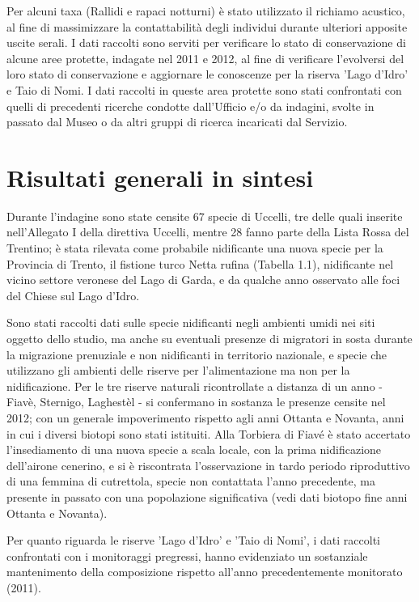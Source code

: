\documentclass[11pt,a4paper,twoside]{memoir}
\begin{document}
Per alcuni taxa (Rallidi e rapaci notturni) è stato utilizzato il richiamo acustico, al fine di massimizzare la contattabilità degli individui durante ulteriori apposite uscite serali. I dati raccolti sono serviti per verificare lo stato di conservazione di alcune aree protette, indagate nel 2011 e 2012, al fine di verificare l'evolversi del loro stato di conservazione e aggiornare le conoscenze per la riserva 'Lago d'Idro' e Taio di Nomi. I dati raccolti in queste area protette sono stati confrontati con quelli di precedenti ricerche condotte dall'Ufficio e/o da indagini, svolte in passato dal Museo o da altri gruppi di ricerca incaricati dal Servizio.

\chapter{Risultati generali in sintesi}
Durante l'indagine sono state censite 67 specie di Uccelli, tre delle quali inserite nell'Allegato I della direttiva Uccelli, mentre 28 fanno parte della Lista Rossa del Trentino; è stata rilevata come probabile nidificante una nuova specie per la Provincia di Trento, il fistione turco Netta rufina (Tabella 1.1), nidificante nel vicino settore veronese del Lago di Garda, e da qualche anno osservato alle foci del Chiese sul Lago d’Idro.

Sono stati raccolti dati sulle specie nidificanti negli ambienti umidi nei siti oggetto dello studio, ma anche su eventuali presenze di migratori in sosta durante la migrazione prenuziale  e non nidificanti in territorio nazionale, e specie che utilizzano gli ambienti delle riserve per l'alimentazione ma non per la nidificazione.
Per le tre riserve naturali ricontrollate a distanza di un anno - Fiavè, Sternigo, Laghestèl - si confermano in sostanza le presenze censite nel 2012; con un generale impoverimento rispetto agli anni Ottanta e Novanta, anni in cui i diversi biotopi sono stati istituiti. Alla Torbiera di Fiavé è stato accertato l’insediamento di una nuova specie a scala locale, con la prima nidificazione dell'airone cenerino, e si è riscontrata l'osservazione in tardo periodo riproduttivo di una femmina di cutrettola, specie non contattata l'anno precedente, ma presente in passato con una popolazione significativa (vedi dati biotopo fine anni Ottanta e Novanta). 

Per quanto riguarda le riserve 'Lago d'Idro' e 'Taio di Nomi', i dati raccolti confrontati con i monitoraggi pregressi, hanno evidenziato un sostanziale mantenimento della composizione rispetto all’anno precedentemente monitorato (2011). 
\end{document}
